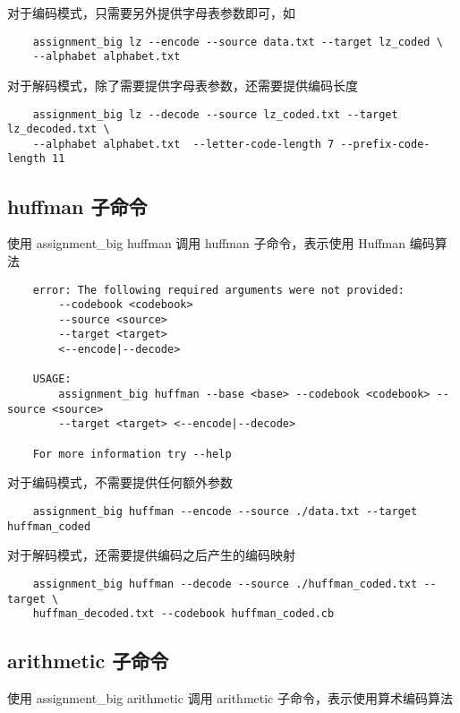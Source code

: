 \documentclass{ctexart}
\begin{document}
对于编码模式，只需要另外提供字母表参数即可，如

\begin{verbatim}
    assignment_big lz --encode --source data.txt --target lz_coded \
    --alphabet alphabet.txt
\end{verbatim}

对于解码模式，除了需要提供字母表参数，还需要提供编码长度

\begin{verbatim}
    assignment_big lz --decode --source lz_coded.txt --target lz_decoded.txt \
    --alphabet alphabet.txt  --letter-code-length 7 --prefix-code-length 11
\end{verbatim}

\subsection{huffman 子命令}

使用 assignment\_big huffman 调用 huffman 子命令，表示使用 Huffman 编码算法

\begin{verbatim}
    error: The following required arguments were not provided:
        --codebook <codebook>
        --source <source>
        --target <target>
        <--encode|--decode>

    USAGE:
        assignment_big huffman --base <base> --codebook <codebook> --source <source>
        --target <target> <--encode|--decode>

    For more information try --help
\end{verbatim}

对于编码模式，不需要提供任何额外参数

\begin{verbatim}
    assignment_big huffman --encode --source ./data.txt --target huffman_coded
\end{verbatim}

对于解码模式，还需要提供编码之后产生的编码映射

\begin{verbatim}
    assignment_big huffman --decode --source ./huffman_coded.txt --target \
    huffman_decoded.txt --codebook huffman_coded.cb
\end{verbatim}

\subsection{arithmetic 子命令}

使用 assignment\_big arithmetic 调用 arithmetic 子命令，表示使用算术编码算法
\end{document}

